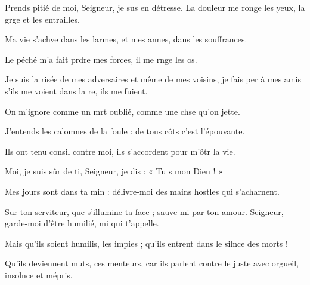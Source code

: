 \item Prends pitié de moi, Seigneur, je sus en détresse.\psstar{} La douleur me ronge les yeux, la grge et les entrailles.
\item Ma vie s’achve dans les larmes,\psstar{} et mes annes, dans les souffrances.
\item Le péché m’a fait prdre mes forces,\psstar{} il me rnge les os.
\item Je suis la risée de mes adversaires et même de mes voisins,\pscross{} je fais per à mes amis\psstar{} s’ils me voient dans la re, ils me fuient.
\item On m’ignore comme un mrt oublié,\psstar{} comme une chse qu’on jette.
\item J’entends les calomnes de la foule :\psstar{} de tous côts c’est l’épouvante.
\item Ils ont tenu consil contre moi,\psstar{} ils s’accordent pour m’ôtr la vie.
\item Moi, je suis sûr de ti, Seigneur,\psstar{} je dis : « Tu s mon Dieu ! »
\item Mes jours sont dans ta min : délivre-moi\psstar{} des mains hostles qui s’acharnent.
\item Sur ton serviteur, que s’illumine ta face ;\pscross{} sauve-mi par ton amour.\psstar{} Seigneur, garde-moi d’être humilié, mi qui t’appelle. 
\item Mais qu’ils soient humilis, les impies ;\psstar{} qu’ils entrent dans le silnce des morts !
\item Qu’ils deviennent muts, ces menteurs,\psstar{} car ils parlent contre le juste avec orgueil, insolnce et mépris.